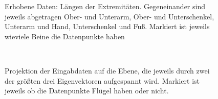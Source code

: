 \begin{figure}
   \caption{Erhobene Daten: Längen der Extremitäten. Gegeneinander sind jeweils abgetragen Ober- und Unterarm, Ober- und Unterschenkel, Unterarm und Hand, Unterschenkel und Fuß. Markiert ist jeweils wieviele Beine die Datenpunkte haben}
   \label{input_data_lengths_legs}
  \end{figure}
 
 
 
 \begin{figure}
  \centering
  \qquad
  \\
  
  \caption{Projektion der Eingabdaten auf die Ebene, die jeweils durch zwei der größten drei Eigenvektoren aufgespannt wird. Markiert ist jeweils ob die Datenpunkte Flügel haben oder nicht.}
  \label{projection_wings}
 \end{figure}
 
